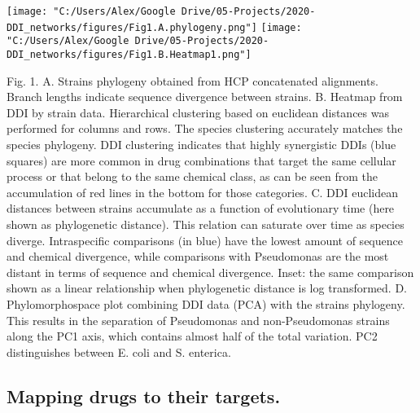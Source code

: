 \documentclass[]{elsarticle} %
\begin{document}
\texttt{[image: "C:/Users/Alex/Google Drive/05-Projects/2020-DDI\_networks/figures/Fig1.A.phylogeny.png"]} \texttt{[image: "C:/Users/Alex/Google Drive/05-Projects/2020-DDI\_networks/figures/Fig1.B.Heatmap1.png"]}

Fig. 1. A. Strains phylogeny obtained from HCP concatenated alignments. Branch lengths indicate sequence divergence between strains. B. Heatmap from DDI by strain data. Hierarchical clustering based on euclidean distances was performed for columns and rows. The species clustering accurately matches the species phylogeny. DDI clustering indicates that highly synergistic DDIs (blue squares) are more common in drug combinations that target the same cellular process or that belong to the same chemical class, as can be seen from the accumulation of red lines in the bottom for those categories. C. DDI euclidean distances between strains accumulate as a function of evolutionary time (here shown as phylogenetic distance). This relation can saturate over time as species diverge. Intraspecific comparisons (in blue) have the lowest amount of sequence and chemical divergence, while comparisons with Pseudomonas are the most distant in terms of sequence and chemical divergence. Inset: the same comparison shown as a linear relationship when phylogenetic distance is log transformed. D. Phylomorphospace plot combining DDI data (PCA) with the strains phylogeny. This results in the separation of Pseudomonas and non-Pseudomonas strains along the PC1 axis, which contains almost half of the total variation. PC2 distinguishes between E. coli and S. enterica.

\hypertarget{mapping-drugs-to-their-targets.}{%
\subsection{Mapping drugs to their targets.}\label{mapping-drugs-to-their-targets.}}
\end{document}
